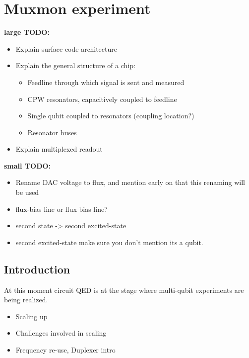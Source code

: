 

\part{Muxmon experiment}

  \textbf{large TODO:}
  \begin{itemize}
    \item Explain surface code architecture
    \item Explain the general structure of a chip:
    \begin{itemize}
      \item Feedline through which signal is sent and measured
      \item CPW resonators, capacitively coupled to feedline
      \item Single qubit coupled to resonators (coupling location?)
      \item Resonator buses
    \end{itemize}
    \item Explain multiplexed readout
  \end{itemize}

  \textbf{small TODO:}
  \begin{itemize}
    \item Rename DAC voltage to flux, and mention early on that this renaming will be used
    \item flux-bias line or flux bias line?
    \item second state -> second excited-state
    \item second excited-state make sure you don't mention its a qubit.
  \end{itemize}



  \chapter*{Introduction}

    At this moment circuit QED is at the stage where multi-qubit experiments are being realized.

    \begin{itemize}
        \item Scaling up
        \item Challenges involved in scaling
        \item Frequency re-use, Duplexer intro
    \end{itemize}


